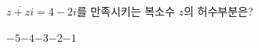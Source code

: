 $\overline{z+zi}=4-2i$를 만족시키는 복소수 $z$의 허수부분은? 
\begin{choices32}{$-5$}{$-4$}{$-3$}{$-2$}{$-1$}\end{choices32}
